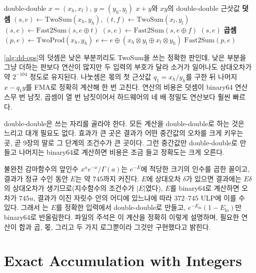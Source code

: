 \begin{algorithm}[t]
\begin{algorithmic}[1]
\Require double-double $x=(x_h,x_l)$, $y=(y_h,y_l)$
\Ensure $x+y$와 $xy$의 double-double 근삿값
\Statex \textbf{덧셈}
\State $(s,e)\gets\mathrm{TwoSum}(x_h,y_h)$, $(t,f)\gets\mathrm{TwoSum}(x_l,y_l)$
\State $(s,e)\gets\mathrm{Fast2Sum}(s,e\oplus t)$
\State $(s,e)\gets\mathrm{Fast2Sum}(s,e\oplus f)$
\State \Return $(s,e)$
\Statex \textbf{곱셈}
\State $(p,e)\gets\mathrm{TwoProd}(x_h,y_h)$
\State $e\gets e\oplus(x_h\otimes y_l\oplus x_l\otimes y_h)$
\State \Return $\mathrm{Fast2Sum}(p,e)$
\end{algorithmic}
\caption{double-double의 덧셈과 곱셈}
\label{alg:dd-ops}
\end{algorithm}

\cref{alg:dd-ops}의 덧셈은 낮은 부분끼리도 TwoSum을 쓰는 정확한 판인데, 낮은 부분을 그냥 더하는 판보다 연산이 많지만 두 입력의 부호가 달라 소거가 일어나도 상대오차가 약 $2^{-104}$ 정도로 유지된다\cite{hida2001qd}. 나눗셈은 몫의 첫 근삿값 $q_1=x_h/y_h$를 구한 뒤 나머지 $x-q_1y$를 FMA로 정확히 계산해 한 번 고친다. 연산의 비용은 덧셈이 binary64 연산 스무 번 남짓, 곱셈이 열 번 남짓이어서 하드웨어의 네 배 정밀도 연산보다 훨씬 빠르다.

double-double은 쓰는 자리를 골라야 한다. 모든 계산을 double-double로 하는 것은 느리고 대개 필요도 없다. 효과가 큰 곳은 결과가 어떤 중간값의 오차를 크게 키우는 곳, 곧 9장의 말로 그 단계의 조건수가 큰 곳이다. 그런 중간값만 double-double로 만들고 나머지는 binary64로 계산하면 비용은 조금 들고 정확도는 크게 오른다.

\begin{instardust}
불완전 감마함수의 앞인수 $x^ae^{-x}/\Gamma(a)$는 $e^{-E}$에 적당한 크기의 인수를 곱한 꼴이고, 결과가 정규 수인 동안 $E$는 약 $745$까지 커진다. $E$에 상대오차 $\delta$가 있으면 결과에는 $E\delta$의 상대오차가 생기므로(지수함수의 조건수가 $|E|$였다), $E$를 binary64로 계산하면 오차가 $745u$, 결과가 이진 자릿수 안의 어디에 있느냐에 따라 $372$--$745$ ULP에 이를 수 있다. 그래서 는 $E$를 정확한 입력에서 double-double로 만들고, $e^{-E_{\mathrm{hi}}}(1-E_{\mathrm{lo}})$만 binary64로 반올림한다. 파일의 주석은 이 계산을 정확히 이렇게 설명하며, 필요한 연산이 합과 곱, 몫, 그리고 두 가지 로그뿐이라 그것만 구현했다고 밝힌다.
\end{instardust}

\section{Exact Accumulation with Integers}
\label{sec:integer-accumulation}

